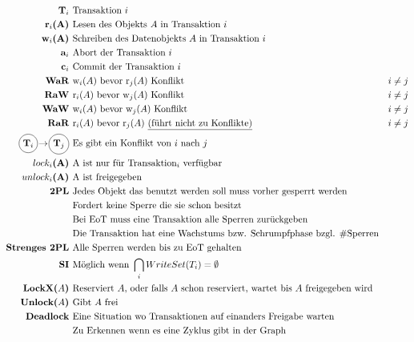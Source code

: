 \documentclass{article}
\newcommand*\circled[1]{\tikz[baseline=(char.base)]{\node[shape=circle,draw,inner sep=2pt] (char) {#1};}}
\begin{document}
		\begin{align*}
			\textbf{T$_i$ } 					& \text{Transaktion $i$}\\
			\textbf{r$_i$(A) } 					& \text{Lesen des Objekts $A$ in Transaktion $i$}\\
			\textbf{w$_i$(A) } 					& \text{Schreiben des Datenobjekts $A$ in Transaktion $i$}\\
			\textbf{a$_i$ } 					& \text{Abort der Transaktion $i$}\\
			\textbf{c$_i$ }						& \text{Commit der Transaktion $i$}\\
			\textbf{WaR }						& \text{w$_i(A)$ bevor r$_j(A)$ Konflikt} & i \neq j\\
			\textbf{RaW } 						& \text{r$_i(A)$ bevor w$_j(A)$ Konflikt} & i \neq j\\
			\textbf{WaW } 						& \text{w$_i(A)$ bevor w$_j(A)$ Konflikt} & i \neq j\\
			\textbf{RaR } 						& \text{r$_i(A)$ bevor r$_j(A)$ \underline{(f\"uhrt nicht zu Konflikte)}} & i \neq j\\
			\textbf{\circled{T$_i$}\hspace{-3pt} $\rightarrow$\hspace{-3pt} \circled{T$_j$} }
												& \text{Es gibt ein Konflikt von $i$ nach $j$ }\\
			\textbf{$lock_i$(A) } 				& \text{A ist nur f\"ur Transaktion$_i$ verf\"ugbar}\\
			\textbf{$unlock_i$(A) }				& \text{A ist freigegeben}\\
			\textbf{2PL }						& \text{Jedes Objekt das benutzt werden soll muss vorher gesperrt werden}\\
												& \text{Fordert keine Sperre die sie schon besitzt} \\
												& \text{Bei EoT muss eine Transaktion alle Sperren zur\"uckgeben} \\
												& \text{Die Transaktion hat eine Wachstums bzw. Schrumpfphase bzgl. \#Sperren} \\
			\textbf{Strenges 2PL }				& \text{Alle Sperren werden bis zu EoT gehalten}\\
			\textbf{SI }						& \text{M\"oglich wenn } \bigcap_{i}WriteSet(T_i) = \emptyset\\
			\textbf{LockX($A$) } 				& \text{Reserviert $A$, oder falls $A$ schon reserviert, wartet bis $A$ freigegeben wird}\\
			\textbf{Unlock($A$) }				& \text{Gibt $A$ frei}\\
			\textbf{Deadlock }					& \text{Eine Situation wo Transaktionen auf einanders Freigabe warten}\\
												& \text{Zu Erkennen wenn es eine Zyklus gibt in der Graph}\\
			\textbf{}
		\end{align*}
\end{document}
